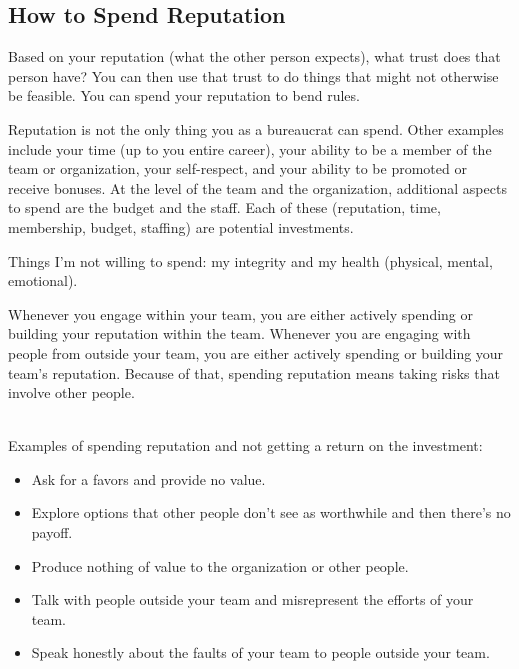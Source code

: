 \subsection*{How to Spend Reputation}

Based on your reputation (what the other person expects), what trust does that person have?  You can then use that trust to do things that might not otherwise be feasible. You can spend your reputation to bend  rules. 

Reputation is not the only thing you as a bureaucrat can spend. Other examples include your time (up to you entire career), your ability to be a member of the team or organization, your self-respect, and your ability to be promoted or receive bonuses. At the level of the team and the organization, additional aspects to spend are the budget and the staff. Each of these (reputation, time, membership, budget, staffing) are potential investments. 

Things I'm not willing to spend: my integrity and my health (physical, mental, emotional).


Whenever you engage within your team, you are either actively spending or building your reputation within the team.
Whenever you are engaging with people from outside your team, you are either actively spending or building your team's reputation.
Because of that, spending reputation means taking risks that involve other people.

\ \\

Examples of spending reputation and not getting a return on the investment:
\begin{itemize}
    \item Ask for a favors and provide no value.
    \item Explore options that other people don't see as worthwhile and then there's no payoff.
    \item Produce nothing of value to the organization or other people.
    \item Talk with people outside your team and misrepresent the efforts of your team.
    \item Speak honestly about the faults of your team to people outside your team.
\end{itemize}












